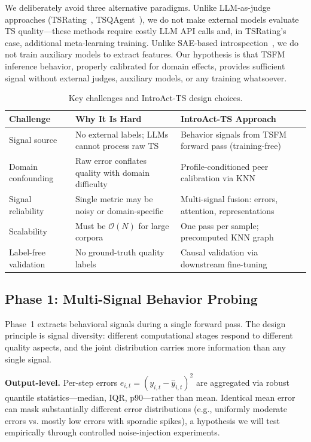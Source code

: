 \documentclass{article}
\begin{document}
We deliberately avoid three alternative paradigms. Unlike LLM-as-judge approaches (TSRating~\citep{chen2026tsrating}, TSQAgent~\citep{wu2026tsqagent}), we do not make external models evaluate TS quality---these methods require costly LLM API calls and, in TSRating's case, additional meta-learning training. Unlike SAE-based introspection~\citep{shi2026igds}, we do not train auxiliary models to extract features. Our hypothesis is that TSFM inference behavior, properly calibrated for domain effects, provides sufficient signal without external judges, auxiliary models, or any training whatsoever.

\begin{table}[t]
\centering
\caption{Key challenges and IntroAct-TS design choices.}
\label{tab:challenge_module}
\begin{tabular}{p{3.5cm}p{5.5cm}p{5.2cm}}
\toprule
\textbf{Challenge} & \textbf{Why It Is Hard} & \textbf{IntroAct-TS Approach} \\
\midrule
Signal source & No external labels; LLMs cannot process raw TS & Behavior signals from TSFM forward pass (training-free) \\
\midrule
Domain confounding & Raw error conflates quality with domain difficulty & Profile-conditioned peer calibration via KNN \\
\midrule
Signal reliability & Single metric may be noisy or domain-specific & Multi-signal fusion: errors, attention, representations \\
\midrule
Scalability & Must be $\mathcal{O}(N)$ for large corpora & One pass per sample; precomputed KNN graph \\
\midrule
Label-free validation & No ground-truth quality labels & Causal validation via downstream fine-tuning \\
\bottomrule
\end{tabular}
\end{table}

\subsection{Phase 1: Multi-Signal Behavior Probing}

Phase~1 extracts behavioral signals during a single forward pass. The design principle is signal diversity: different computational stages respond to different quality aspects, and the joint distribution carries more information than any single signal.

\textbf{Output-level.} Per-step errors $e_{i,t} = (y_{i,t} - \hat{y}_{i,t})^2$ are aggregated via robust quantile statistics---median, IQR, p90---rather than mean. Identical mean error can mask substantially different error distributions (e.g., uniformly moderate errors vs. mostly low errors with sporadic spikes), a hypothesis we will test empirically through controlled noise-injection experiments.
\end{document}
